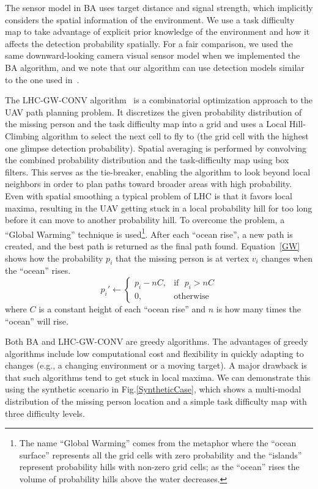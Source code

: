 The sensor model in BA uses target distance and signal strength, which implicitly considers the spatial information of the environment. We use a task difficulty map to take advantage of explicit prior knowledge of the environment and how it affects the detection probability spatially. For a fair comparison, we used the same downward-looking camera visual sensor model when we implemented the BA algorithm, and we note that our algorithm can use detection models similar to the one used in~\cite{Bourgault2006Optimal}.

The LHC-GW-CONV algorithm~\cite{Lin2009UAV} is a combinatorial optimization approach to the UAV path planning problem. It discretizes the given probability distribution of the missing person and the task difficulty map into a grid and uses a Local Hill-Climbing algorithm to select the next cell to fly to (the grid cell with the highest one glimpse detection probability). Spatial averaging is performed by convolving the combined probability distribution and the task-difficulty map using box filters. This serves as the tie-breaker, enabling the algorithm to look beyond local neighbors in order to plan paths toward broader areas with high probability. Even with spatial smoothing a typical problem of LHC is that it favors local maxima, resulting in the UAV getting stuck in a local probability hill for too long before it can move to another probability hill. To overcome the problem, a ``Global Warming'' technique is used\footnote{The name ``Global Warming'' comes from the metaphor where the ``ocean surface'' represents all the grid cells with zero probability and the ``islands'' represent probability hills with non-zero grid cells; as the ``ocean'' rises the volume of probability hills above the water decreases.}. After each ``ocean rise'', a new path is created, and the best path is returned as the final path found. Equation~\ref{GW} shows how the probability $p_i$ that the missing person is at vertex $v_i$  changes when the ``ocean'' rises.
\begin{equation}
p_i' \leftarrow
	\left\{
	\begin{array}{ll}
		p_i - nC, & \mbox{if~~} p_i > nC \\
		0, & \mbox{otherwise}
	\end{array}
	\right.
\label{GW}
\end{equation}
where $C$ is a constant height of each ``ocean rise'' and $n$ is how many times the ``ocean'' will rise.

Both BA and LHC-GW-CONV are greedy algorithms. The advantages of greedy algorithms include low computational cost and flexibility in quickly adapting to changes (e.g., a changing environment or a moving target). A major drawback is that such algorithms tend to get stuck in local maxima. We can demonstrate this using the synthetic scenario in Fig.\ref{SyntheticCase}, which shows a multi-modal distribution of the missing person location and a simple task difficulty map with three difficulty levels. 


